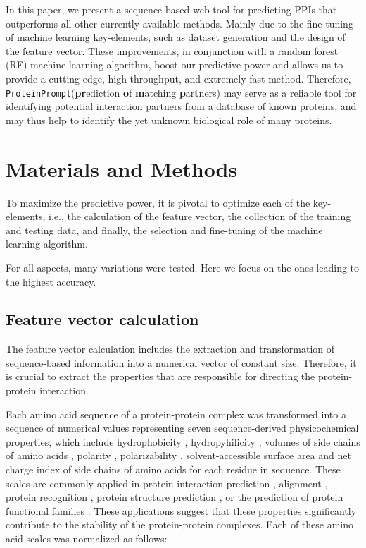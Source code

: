 \documentclass[preprint,3p,times,twocolumn]{elsarticle}
\newcommand{\tool}{\texttt{ProteinPrompt}\hspace{2pt}}
\begin{document}
In this paper, we present a sequence-based web-tool for predicting
PPIs that outperforms all other currently available methods. Mainly
due to the fine-tuning of machine learning key-elements, such as
dataset generation and the design of the feature vector. These
improvements, in conjunction with a random forest (RF) machine
learning algorithm, boost our predictive power and allows us to
provide a cutting-edge, high-throughput, and extremely fast
method. Therefore, \tool (\textbf{pr}ediction \textbf{o}f
\textbf{m}atching \textbf{p}ar\textbf{t}ners) may serve as a reliable
tool for identifying potential interaction partners from a database of
known proteins, and may thus help to identify the yet unknown
biological role of many proteins.


\section{Materials and Methods}

To maximize the predictive power, it is pivotal to optimize each of
the key-elements, i.e., the calculation of the feature vector, the
collection of the training and testing data, and finally, the
selection and fine-tuning of the machine learning algorithm. 

For all aspects, many variations were tested. Here we focus on the
ones leading to the highest accuracy. 


\subsection{Feature vector calculation}
The feature vector calculation includes the extraction and
transformation of sequence-based information into a numerical vector
of constant size. Therefore, it is crucial to extract the properties
that are responsible for directing the protein-protein interaction. 

Each amino acid sequence of a protein-protein complex was transformed
into a sequence of numerical values representing seven
sequence-derived physicochemical properties, which include
hydrophobicity \cite{Eisenberg:1984, Koehler:2009}, hydropyhilicity
\cite{Hopp:1981}, volumes of side chains of amino acids
\cite{Krigbaum:1979}, polarity \cite{Grantham:1974}, polarizability
\cite{Charton:1982}, solvent-accessible surface area \cite{Rose:1985}
and net charge index of side chains of amino acids \cite{Zhou:2006}
for each residue in sequence. These scales are commonly applied in
protein interaction prediction \cite{Bock:2001} \cite{Bock:2003},
alignment \cite{Stamm:2013}, protein recognition \cite{Ding:2001},
protein structure prediction \cite{Durham:2009}, or the prediction of
protein functional families \cite{Cai:2003}. These applications
suggest that these properties significantly contribute to the
stability of the protein-protein complexes. Each of these amino acid
scales was normalized as follows: 
\end{document}
